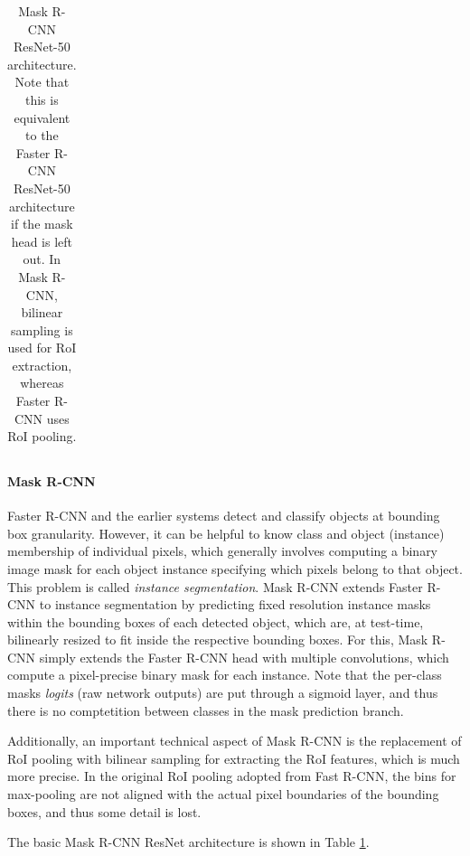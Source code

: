 {\begin{table}[t]
\begin{tabular}{llr}
\bottomrule
\end{tabular}
\caption {
Mask R-CNN \cite{MaskRCNN} ResNet-50 \cite{ResNet} architecture.
Note that this is equivalent to the Faster R-CNN ResNet-50 architecture if the mask
head is left out. In Mask R-CNN, bilinear sampling is used for RoI extraction,
whereas Faster R-CNN uses RoI pooling.
}
\label{table:maskrcnn_resnet}
\end{table}
}

\paragraph{Mask R-CNN}
Faster R-CNN and the earlier systems detect and classify objects at bounding box granularity.
However, it can be helpful to know class and object (instance) membership of individual pixels,
which generally involves computing a binary image mask for each object instance specifying which pixels belong
to that object. This problem is called \emph{instance segmentation}.
Mask R-CNN \cite{MaskRCNN} extends Faster R-CNN to instance segmentation by predicting
fixed resolution instance masks within the bounding boxes of each detected object,
which are, at test-time, bilinearly resized to fit inside the respective bounding boxes.
For this, Mask R-CNN simply extends the Faster R-CNN head with multiple convolutions, which
compute a pixel-precise binary mask for each instance.
Note that the per-class masks \emph{logits} (raw network outputs) are put through a sigmoid layer, and thus there is no
comptetition between classes in the mask prediction branch.

Additionally, an important technical aspect of Mask R-CNN is the replacement of RoI pooling with
bilinear sampling for extracting the RoI features, which is much more precise.
In the original RoI pooling adopted from Fast R-CNN, the bins for max-pooling are not aligned with the actual pixel
boundaries of the bounding boxes, and thus some detail is lost.

The basic Mask R-CNN ResNet architecture is shown in Table \ref{table:maskrcnn_resnet}.

